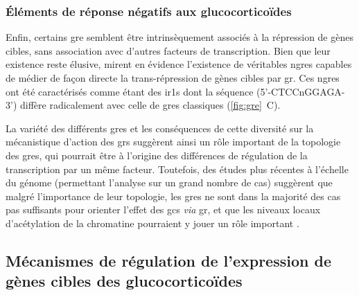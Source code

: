 \documentclass[../main.tex]{subfiles}
\begin{document}
		\subsubsection{Éléments de réponse négatifs aux glucocorticoïdes}
			Enfin, certains \gls{gre} semblent être intrinsèquement associés à la répression de gènes cibles, sans association avec d'autres facteurs de transcription.
			Bien que leur existence reste élusive, \citet{Surjit2011} mirent en évidence l'existence de véritables \glspl{ngre} capables de médier de façon directe la trans-répression de gènes cibles par \gls{gr}.
			Ces \glspl{ngre} ont été caractérisés comme étant des \glspl{ir1} dont la séquence (5'-CTCCnGGAGA-3') diffère radicalement avec celle de \glspl{gre} classiques (\autoref{fig:gre}~C).
		\\
		\par
		La variété des différents \glspl{gre} et les conséquences de cette diversité sur la mécanistique d'action des \glspl{gr} suggèrent ainsi un rôle important de la topologie des \glspl{gre}, qui pourrait être à l'origine des différences de régulation de la transcription par un même facteur.
		Toutefois, des études plus récentes à l'échelle du génome (permettant l'analyse sur un grand nombre de cas) suggèrent que malgré l'importance de leur topologie, les \glspl{gre} ne sont dans la majorité des cas pas suffisants pour orienter l'effet des \glspl{gc} \textit{via} \gls{gr}, et que les niveaux locaux d'acétylation de la chromatine pourraient y jouer un rôle important \citep{Uhlenhaut2013}.


	\subsection{Mécanismes de régulation de l'expression de gènes cibles des glucocorticoïdes}\label{subsec:meca-action-gc-via-gr}
\end{document}
